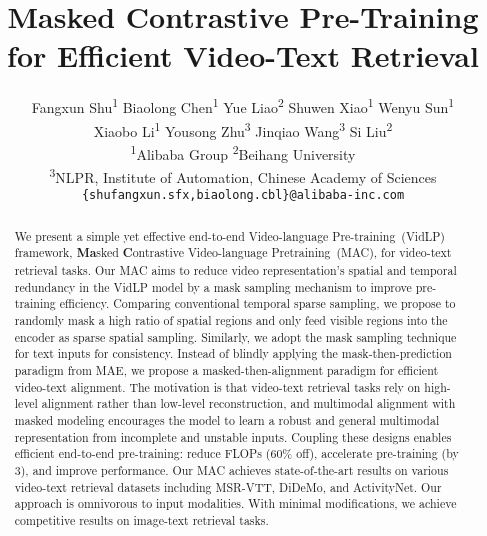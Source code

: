 \documentclass[10pt,twocolumn,letterpaper]{article}
\begin{document}
\title{Masked Contrastive Pre-Training for Efficient Video-Text Retrieval}

\author{  
  Fangxun Shu\textsuperscript{\rm 1} \quad Biaolong Chen\textsuperscript{\rm 1} \quad Yue Liao\textsuperscript{\rm 2} \quad Shuwen Xiao\textsuperscript{\rm 1} \quad Wenyu Sun\textsuperscript{\rm 1}  \\ Xiaobo Li\textsuperscript{\rm 1} \quad Yousong Zhu\textsuperscript{\rm 3} \quad Jinqiao Wang\textsuperscript{\rm 3}  \quad Si Liu\textsuperscript{\rm 2} \\
   \textsuperscript{\rm 1}Alibaba Group \quad
  \textsuperscript{\rm 2}Beihang University \quad
    \\ \textsuperscript{\rm 3}NLPR, Institute of Automation,
Chinese Academy of Sciences
 \\ {\tt\small \{shufangxun.sfx,biaolong.cbl\}@alibaba-inc.com}
}
\maketitle

\begin{abstract}
   We present a simple yet effective end-to-end Video-language Pre-training~(VidLP) framework, \textbf{Ma}sked \textbf{C}ontrastive Video-language Pretraining~(MAC), for video-text retrieval tasks. Our MAC aims to reduce video representation's spatial and temporal redundancy in the VidLP model by a mask sampling mechanism to improve pre-training efficiency. Comparing conventional temporal sparse sampling, we propose to randomly mask a high ratio of spatial regions and only feed visible regions into the encoder as sparse spatial sampling. Similarly, we adopt the mask sampling technique for text inputs for consistency. Instead of blindly applying the mask-then-prediction paradigm from MAE, we propose a masked-then-alignment paradigm for efficient video-text alignment. The motivation is that video-text retrieval tasks rely on high-level alignment rather than low-level reconstruction, and multimodal alignment with masked modeling encourages the model to learn a robust and general multimodal representation from incomplete and unstable inputs. Coupling these designs enables efficient end-to-end pre-training: reduce FLOPs (60\% off), accelerate pre-training (by 3), and improve performance. Our MAC achieves state-of-the-art results on various video-text retrieval datasets including MSR-VTT, DiDeMo, and ActivityNet. Our approach is omnivorous to input modalities. With minimal modifications, we achieve competitive results on image-text retrieval tasks.

\end{abstract}
\end{document}
